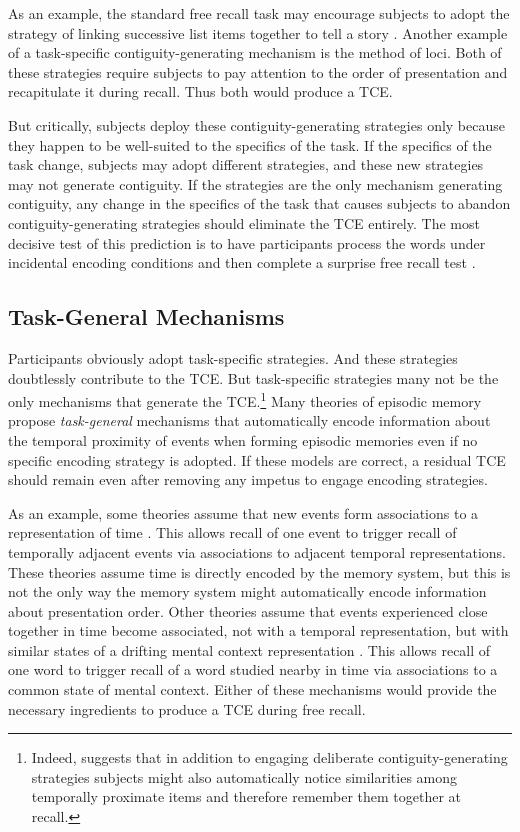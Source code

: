 \documentclass[man,natbib,floatsintext]{apa6} %
\begin{document}
As an example, the standard free recall task may encourage subjects to adopt the strategy of linking successive list items together to tell a story \citep{DelaKnow05}. Another example of a task-specific contiguity-generating mechanism is the method of loci. Both of these strategies  require subjects to pay attention to the order of presentation and recapitulate it during recall. Thus both would produce a TCE. 

But critically, subjects deploy these contiguity-generating strategies only because they happen to be well-suited to the specifics of the task. If the specifics of the task change, subjects may adopt different strategies, and these new strategies may not generate contiguity.
If the strategies are the only mechanism generating contiguity, any change in the specifics of the task that causes subjects to abandon contiguity-generating strategies should eliminate the TCE entirely. The most decisive test of this prediction is to have participants process the words under incidental encoding conditions and then complete a surprise free recall test \citep{Hint16}.

\subsection{Task-General Mechanisms}
Participants obviously adopt task-specific strategies. And these strategies doubtlessly contribute to the TCE. But task-specific strategies many not be the only mechanisms that generate the TCE.\footnote{Indeed, \citet{Hint16} suggests that in addition to engaging deliberate contiguity-generating strategies subjects might also automatically notice similarities among temporally proximate items and therefore remember them together at recall.} Many theories of episodic memory propose \emph{task-general} mechanisms that automatically encode information about the temporal proximity of events when forming episodic memories even if no specific encoding strategy is adopted. If these models are correct, a residual TCE should remain even after removing any impetus to engage encoding strategies. 

As an example, some theories assume that new events form associations to a representation of time \citep{HowaEtal14a,BrowEtal07}. This allows recall of one event to trigger recall of temporally adjacent events via associations to adjacent temporal representations. These theories assume time is directly encoded by the memory system, but this is not the only way the memory system might automatically encode information about presentation order. Other theories assume that events experienced close together in time become associated, not with a temporal representation, but with similar states of a drifting mental context representation \citep{PolyEtal09,LohnEtal14,McGe32}. This allows recall of one word to trigger recall of a word studied nearby in time via associations to a common state of mental context. Either of these mechanisms would provide the necessary ingredients to produce a TCE during free recall. 
\end{document}
